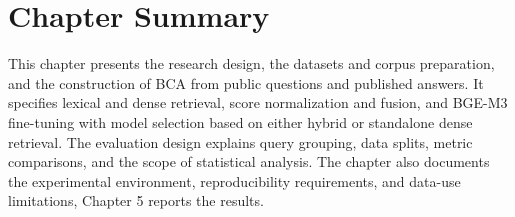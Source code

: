 \section{Chapter Summary}
\label{sec:method-summary}

This chapter presents the research design, the datasets and corpus preparation, and the construction of BCA from public questions and published answers. It specifies lexical and dense retrieval, score normalization and fusion, and BGE-M3 fine-tuning with model selection based on either hybrid or standalone dense retrieval. The evaluation design explains query grouping, data splits, metric comparisons, and the scope of statistical analysis. The chapter also documents the experimental environment, reproducibility requirements, and data-use limitations, Chapter 5 reports the results.
